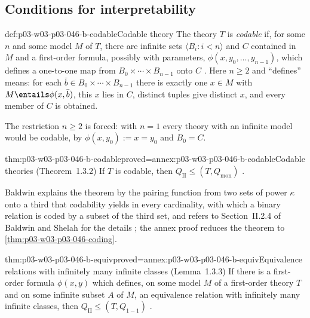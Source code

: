 \subsection{Conditions for interpretability}
\label{sec:p03-w03-p03-046-b-conditions}

\begin{hbdefinition}{def:p03-w03-p03-046-b-codable}{Codable theory}
The theory \(T\) is \emph{codable} if, for some \(n\) and some model \(M\)
of \(T\), there are infinite sets \(\langle B_i:i<n\rangle\) and \(C\)
contained in \(M\) and a first-order formula, possibly with parameters,
\(\phi(x,y_0,\dots,y_{n-1})\), which defines a one-to-one map from
\(B_0\times\cdots\times B_{n-1}\) onto \(C\)
\cite[p.~450, Definition~1.3.1]{Baldwin1985DSOQ}. Here \(n\ge2\) and
``defines'' means: for each \(\bar b\in B_0\times\cdots\times B_{n-1}\)
there is exactly one \(x\in M\) with \(M\entails\phi(x,\bar b)\), this
\(x\) lies in \(C\), distinct tuples give distinct \(x\), and every member
of \(C\) is obtained.
\end{hbdefinition}

The restriction \(n\ge2\) is forced: with \(n=1\) every theory with an
infinite model would be codable, by \(\phi(x,y_0):=x=y_0\) and
\(B_0=C\).

\begin{hbtheorem}{thm:p03-w03-p03-046-b-codable}{proved=annex:p03-w03-p03-046-b-codable}{Codable theories (Theorem~1.3.2)}
If \(T\) is codable, then \(Q_{\mathrm{II}}\le(T,Q_{\mathrm{mon}})\)
\cite[p.~450, Theorem~1.3.2]{Baldwin1985DSOQ}.
\end{hbtheorem}

Baldwin explains the theorem by the pairing function from two sets of
power \(\kappa\) onto a third that codability yields in every cardinality,
with which a binary relation is coded by a subset of the third set, and
refers to Section~II.2.4 of Baldwin and Shelah for the details
\cite[p.~450]{Baldwin1985DSOQ}; the annex proof reduces the theorem to
\cref{thm:p03-w03-p03-046-coding}.

\begin{hbtheorem}{thm:p03-w03-p03-046-b-equiv}{proved=annex:p03-w03-p03-046-b-equiv}{Equivalence relations with infinitely many infinite classes (Lemma~1.3.3)}
If there is a first-order formula \(\phi(x,y)\) which defines, on some
model \(M\) of a first-order theory \(T\) and on some infinite subset
\(A\) of \(M\), an equivalence relation with infinitely many infinite
classes, then \(Q_{\mathrm{II}}\le(T,Q_{1-1})\)
\cite[p.~451, Lemma~1.3.3]{Baldwin1985DSOQ}.
\end{hbtheorem}

